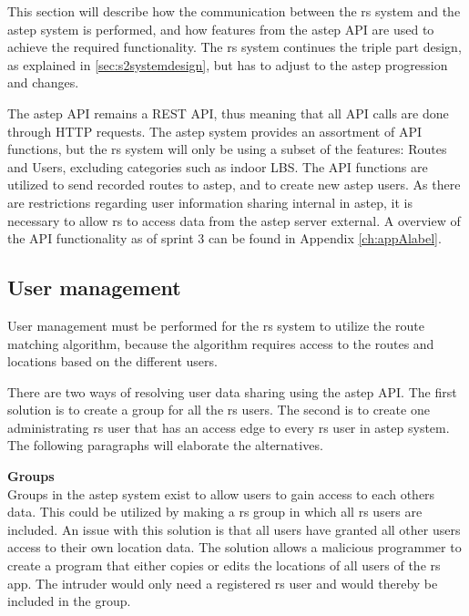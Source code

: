 \label{sec:aSTEPCommunication.tex}
This section will describe how the communication between the \gls{rs} system and the \gls{astep} system is performed, and how features from the \gls{astep} API are used to achieve the required functionality.
The \gls{rs} system continues the triple part design, as explained in \ref{sec:s2systemdesign}, but has to adjust to the \gls{astep} progression and changes.

The \gls{astep} API remains a REST API, thus meaning that all API calls are done through HTTP requests.
The \gls{astep} system provides an assortment of API functions, but the \gls{rs} system will only be using a subset of the features: Routes and Users, excluding categories such as indoor LBS.
The API functions are utilized to send recorded routes to \gls{astep}, and to create new \gls{astep} users.
As there are restrictions regarding user information sharing internal in \gls{astep}, it is necessary to allow \gls{rs} to access data from the \gls{astep} server external.
A overview of the API functionality as of sprint 3 can be found in Appendix \ref{ch:appAlabel}. 

\subsection{User management}\label{subsec:usermanagement}
User management must be performed for the \gls{rs} system to utilize the route matching algorithm, because the algorithm requires access to the routes and locations based on the different users.

There are two ways of resolving user data sharing using the \gls{astep} API.
The first solution is to create a group for all the \gls{rs} users.
The second is to create one administrating \gls{rs} user that has an access edge to every \gls{rs} user in \gls{astep} system.
The following paragraphs will elaborate the alternatives.

\textbf{Groups}\\ 
Groups in the \gls{astep} system exist to allow users to gain access to each others data.
This could be utilized by making a \gls{rs} group in which all \gls{rs} users are included.
An issue with this solution is that all users have granted all other users access to their own location data. 
The solution allows a malicious programmer to create a program that either copies or edits the locations of all users of the \gls{rs} app.
The intruder would only need a registered \gls{rs} user and would thereby be included in the group.

